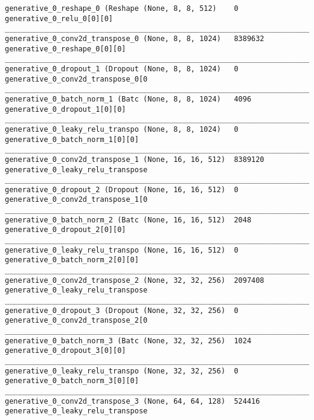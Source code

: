 \begin{lstlisting}[caption={CelebA-\ac{VLAE} Decoder},captionpos=b,basicstyle=\tiny, label={lst:celeba-vlae-decoder}]
generative_0_reshape_0 (Reshape (None, 8, 8, 512)    0           generative_0_relu_0[0][0]
__________________________________________________________________________________________________
generative_0_conv2d_transpose_0 (None, 8, 8, 1024)   8389632     generative_0_reshape_0[0][0]
__________________________________________________________________________________________________
generative_0_dropout_1 (Dropout (None, 8, 8, 1024)   0           generative_0_conv2d_transpose_0[0
__________________________________________________________________________________________________
generative_0_batch_norm_1 (Batc (None, 8, 8, 1024)   4096        generative_0_dropout_1[0][0]
__________________________________________________________________________________________________
generative_0_leaky_relu_transpo (None, 8, 8, 1024)   0           generative_0_batch_norm_1[0][0]
__________________________________________________________________________________________________
generative_0_conv2d_transpose_1 (None, 16, 16, 512)  8389120     generative_0_leaky_relu_transpose
__________________________________________________________________________________________________
generative_0_dropout_2 (Dropout (None, 16, 16, 512)  0           generative_0_conv2d_transpose_1[0
__________________________________________________________________________________________________
generative_0_batch_norm_2 (Batc (None, 16, 16, 512)  2048        generative_0_dropout_2[0][0]
__________________________________________________________________________________________________
generative_0_leaky_relu_transpo (None, 16, 16, 512)  0           generative_0_batch_norm_2[0][0]
__________________________________________________________________________________________________
generative_0_conv2d_transpose_2 (None, 32, 32, 256)  2097408     generative_0_leaky_relu_transpose
__________________________________________________________________________________________________
generative_0_dropout_3 (Dropout (None, 32, 32, 256)  0           generative_0_conv2d_transpose_2[0
__________________________________________________________________________________________________
generative_0_batch_norm_3 (Batc (None, 32, 32, 256)  1024        generative_0_dropout_3[0][0]
__________________________________________________________________________________________________
generative_0_leaky_relu_transpo (None, 32, 32, 256)  0           generative_0_batch_norm_3[0][0]
__________________________________________________________________________________________________
generative_0_conv2d_transpose_3 (None, 64, 64, 128)  524416      generative_0_leaky_relu_transpose

\end{lstlisting}
